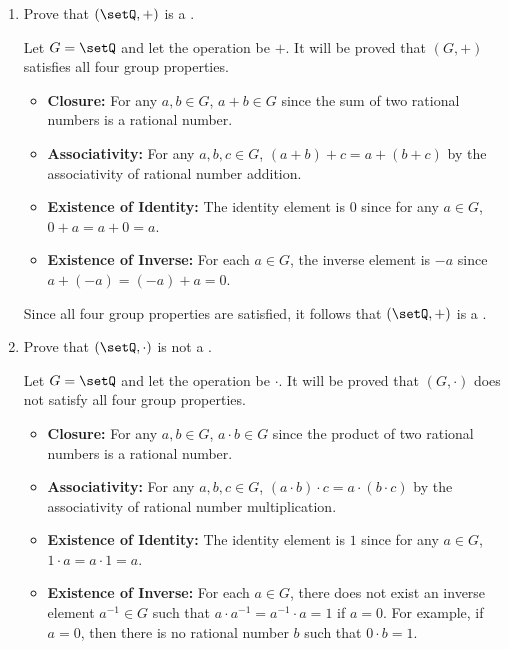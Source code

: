 \begin{enumerate}
\begin{subprove}
  \end{subprove}
  \item Prove that \((\setQ, +)\) is a .
  \begin{subprove}
    Let \(G = \setQ\) and let the operation be \(+\).
    It will be proved that \((G, +)\) satisfies all four group properties.
    \begin{itemize}
      \item \textbf{Closure:} For any \(a, b \in G\), \(a + b \in G\) since the sum of two rational numbers is a rational number.
      \item \textbf{Associativity:} For any \(a, b, c \in G\), \((a + b) + c = a + (b + c)\) by the associativity of rational number addition.
      \item \textbf{Existence of Identity:} The identity element is \(0\) since for any \(a \in G\), \(0 + a = a + 0 = a\).
      \item \textbf{Existence of Inverse:} For each \(a \in G\), the inverse element is \(-a\) since \(a + (-a) = (-a) + a = 0\).
    \end{itemize}
    Since all four group properties are satisfied, it follows that \((\setQ, +)\) is a .
  \end{subprove}
  \item Prove that \((\setQ, \cdot)\) is not a .
  \begin{subprove}
    Let \(G = \setQ\) and let the operation be \(\cdot\).
    It will be proved that \((G, \cdot)\) does not satisfy all four group properties.
    \begin{itemize}
      \item \textbf{Closure:} For any \(a, b \in G\), \(a \cdot b \in G\) since the product of two rational numbers is a rational number.
      \item \textbf{Associativity:} For any \(a, b, c \in G\), \((a \cdot b) \cdot c = a \cdot (b \cdot c)\) by the associativity of rational number multiplication.
      \item \textbf{Existence of Identity:} The identity element is \(1\) since for any \(a \in G\), \(1 \cdot a = a \cdot 1 = a\).
      \item \textbf{Existence of Inverse:} For each \(a \in G\), there does not exist an inverse element \(a^{-1} \in G\) such that \(a \cdot a^{-1} = a^{-1} \cdot a = 1\) if \(a = 0\). For example, if \(a = 0\), then there is no rational number \(b\) such that \(0 \cdot b = 1\).
    \end{itemize}

\end{subprove}
\end{enumerate}
